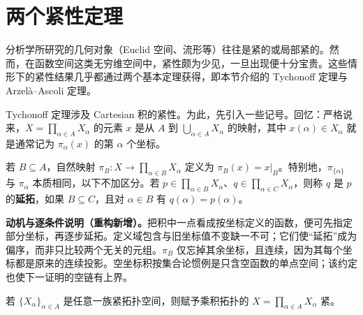 \documentclass[../../main.tex]{subfiles}%
\begin{document}
\section{两个紧性定理}\label{section:ch04-tychonoff}
分析学所研究的几何对象（Euclid 空间、流形等）往往是紧的或局部紧的。然而，在函数空间这类无穷维空间中，紧性颇为少见，一旦出现便十分宝贵。这些情形下的紧性结果几乎都通过两个基本定理获得，即本节介绍的 Tychonoff 定理与 Arzel\`a--Ascoli 定理。

Tychonoff 定理涉及 Cartesian 积的紧性。为此，先引入一些记号。回忆：严格说来，$X=\prod_{\alpha\in A}X_\alpha$ 的元素 $x$ 是从 $A$ 到 $\bigcup_{\alpha\in A}X_\alpha$ 的映射，其中 $x(\alpha)\in X_\alpha$ 就是通常记为 $\pi_\alpha(x)$ 的第 $\alpha$ 个坐标。
\begin{definition}[子乘积投影与延拓]\label{definition:ch04-partial-product-extension}
若 $B\subseteq A$，自然映射 $\pi_B:X\to\prod_{\alpha\in B}X_\alpha$ 定义为 $\pi_B(x)=x|_B$。特别地，$\pi_{\{\alpha\}}$ 与 $\pi_\alpha$ 本质相同，以下不加区分。若 $p\in\prod_{\alpha\in B}X_\alpha$、$q\in\prod_{\alpha\in C}X_\alpha$，则称 $q$ 是 $p$ 的\textbf{延拓}，如果 $B\subseteq C$，且对 $\alpha\in B$ 有 $q(\alpha)=p(\alpha)$。
\end{definition}
\begin{remark}
\textbf{动机与逐条件说明（重构新增）。}把积中一点看成按坐标定义的函数，便可先指定部分坐标，再逐步延拓。定义域包含与旧坐标值不变缺一不可；它们使“延拓”成为偏序，而非只比较两个无关的元组。$\pi_B$ 仅忘掉其余坐标，且连续，因为其每个坐标都是原来的连续投影。空坐标积按集合论惯例是只含空函数的单点空间；该约定也使下一证明的空链有上界。
\end{remark}
\begin{theorem}[Tychonoff 定理]\label{theorem:ch04-tychonoff}
若 $\{X_\alpha\}_{\alpha\in A}$ 是任意一族紧拓扑空间，则赋予乘积拓扑的 $X=\prod_{\alpha\in A}X_\alpha$ 紧。
\end{theorem}
\end{document}
